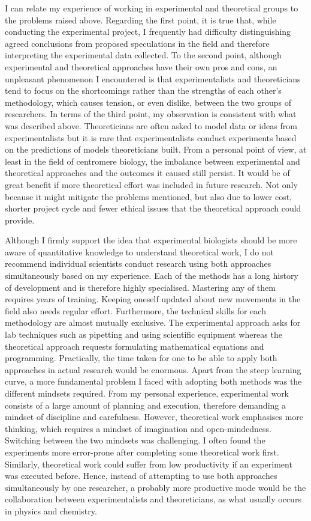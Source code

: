 I can relate my experience of working in experimental and theoretical groups to the problems \cite{Fidelman1985TheModeling} raised above. Regarding the first point, it is true that, while conducting the experimental project, I frequently had difficulty distinguishing agreed conclusions from proposed speculations in the field and therefore interpreting the experimental data collected. To the second point, although experimental and theoretical approaches have their own pros and cons, an unpleasant phenomenon I encountered is that experimentalists and theoreticians tend to focus on the shortcomings rather than the strengths of each other's methodology, which causes tension, or even dislike, between the two groups of researchers. In terms of the third point, my observation is consistent with what was described above. Theoreticians are often asked to model data or ideas from experimentalists but it is rare that experimentalists conduct experiments based on the predictions of models theoreticians built. From a personal point of view, at least in the field of centromere biology, the imbalance between experimental and theoretical approaches and the outcomes it caused still persist. It would be of great benefit if more theoretical effort was included in future research. Not only because it might mitigate the problems mentioned, but also due to lower cost, shorter project cycle and fewer ethical issues that the theoretical approach could provide. 

Although I firmly support the idea that experimental biologists should be more aware of quantitative knowledge to understand theoretical work, I do not recommend individual scientists conduct research using both approaches simultaneously based on my experience. Each of the methods has a long history of development and is therefore highly specialised. Mastering any of them requires years of training. Keeping oneself updated about new movements in the field also needs regular effort. Furthermore, the technical skills for each methodology are almost mutually exclusive. The experimental approach asks for lab techniques such as pipetting and using scientific equipment whereas the theoretical approach requests formulating mathematical equations and programming. Practically, the time taken for one to be able to apply both approaches in actual research would be enormous. Apart from the steep learning curve, a more fundamental problem I faced with adopting both methods was the different mindsets required. From my personal experience, experimental work consists of a large amount of planning and execution, therefore demanding a mindset of discipline and carefulness. However, theoretical work emphasises more thinking, which requires a mindset of imagination and open-mindedness. Switching between the two mindsets was challenging. I often found the experiments more error-prone after completing some theoretical work first. Similarly, theoretical work could suffer from low productivity if an experiment was executed before. Hence, instead of attempting to use both approaches simultaneously by one researcher, a probably more productive mode would be the collaboration between experimentalists and theoreticians, as what usually occurs in physics and chemistry. 
